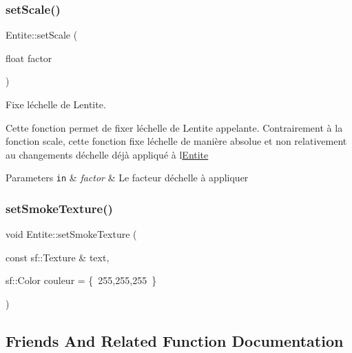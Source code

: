 \subsubsection{\texorpdfstring{set\+Scale()}{setScale()}}
{\footnotesize\ttfamily Entite\+::set\+Scale (\begin{DoxyParamCaption}\item[{float}]{factor }\end{DoxyParamCaption})}



Fixe l\textquotesingle{}échelle de L\textquotesingle{}entite. 

Cette fonction permet de fixer l\textquotesingle{}échelle de L\textquotesingle{}entite appelante. Contrairement à la fonction scale, cette fonction fixe l\textquotesingle{}échelle de manière absolue et non relativement au changements d\textquotesingle{}échelle déjà appliqué à l\textquotesingle{}\mbox{\hyperlink{class_entite}{Entite}} 
\begin{DoxyParams}[1]{Parameters}
\mbox{\tt in}  & {\em factor} & Le facteur d\textquotesingle{}échelle à appliquer \\
\hline
\end{DoxyParams}
\mbox{\label{class_entite_a8cf9eefe7401a127d7692ca379528050}} 
\subsubsection{\texorpdfstring{set\+Smoke\+Texture()}{setSmokeTexture()}}
{\footnotesize\ttfamily void Entite\+::set\+Smoke\+Texture (\begin{DoxyParamCaption}\item[{const sf\+::\+Texture \&}]{text,  }\item[{sf\+::\+Color}]{couleur = {\ttfamily \{~255,255,255~\}} }\end{DoxyParamCaption})}



\subsection{Friends And Related Function Documentation}
\mbox{\label{class_entite_ac5011435e5099909dd34cd1750933b30}} 
